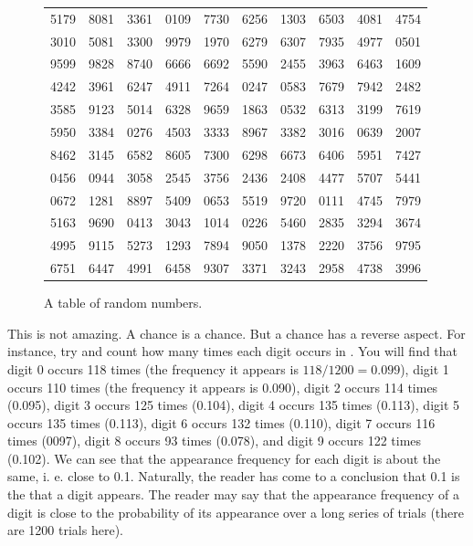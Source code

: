 \begin{figure}[!ht]
\begin{footnotesize}
\begin{tabular}{cccccccccc}
\rowcolor{lightgray} 5179 & 8081 & 3361 & 0109 & 7730 & 6256 & 1303 & 6503 & 4081 & 4754 \\
3010 & 5081 & 3300 & 9979 & 1970 & 6279 & 6307 & 7935 & 4977 & 0501 \\
\hline
9599 & 9828 & 8740 & 6666 & 6692 & 5590 & 2455 & 3963 & 6463 & 1609 \\
\rowcolor{lightgray} 4242 & 3961 & 6247 & 4911 & 7264 & 0247 & 0583 & 7679 & 7942 & 2482 \\
3585 & 9123 & 5014 & 6328 & 9659 & 1863 & 0532 & 6313 & 3199 & 7619 \\
\rowcolor{lightgray} 5950 & 3384 & 0276 & 4503 & 3333 & 8967 & 3382 & 3016 & 0639 & 2007 \\
8462 & 3145 & 6582 & 8605 & 7300 & 6298 & 6673 & 6406 & 5951 & 7427 \\
\hline
0456 & 0944 & 3058 & 2545 & 3756 & 2436 & 2408 & 4477 & 5707 & 5441 \\
\rowcolor{lightgray} 0672 & 1281 & 8897 & 5409 & 0653 & 5519 & 9720 & 0111 & 4745 & 7979 \\
5163 & 9690 & 0413 & 3043 & 1014 & 0226 & 5460 & 2835 & 3294 & 3674 \\
\rowcolor{lightgray} 4995 & 9115 & 5273 & 1293 & 7894 & 9050 & 1378 & 2220 & 3756 & 9795 \\
6751 & 6447 & 4991 & 6458 & 9307 & 3371 & 3243 & 2958 & 4738 & 3996 \\
\hline
\end{tabular}
\end{footnotesize}
\caption{A table of random numbers.\label{random-table}}
\end{figure}

This is not amazing. A chance is a chance. But a chance has a reverse
aspect. For instance, try and count how many times each digit occurs in . You will find that digit 0 occurs 118 times (the frequency it
appears is $118/1200 = 0.099$), digit 1 occurs 110 times (the frequency it
appears is 0.090), digit 2 occurs 114 times (0.095), digit 3 occurs 125
times (0.104), digit 4 occurs 135 times (0.113), digit 5 occurs 135 times
(0.113), digit 6 occurs 132 times (0.110), digit 7 occurs 116 times (0097),
digit 8 occurs 93 times (0.078), and digit 9 occurs 122 times (0.102). We
can see that the appearance frequency for each digit is about the same,
i. e. close to 0.1. Naturally, the reader has come to a conclusion that 0.1
is the  that a digit appears. The reader may say that the
appearance frequency of a digit is close to the probability of its
appearance over a long series of trials (there are 1200 trials here).

